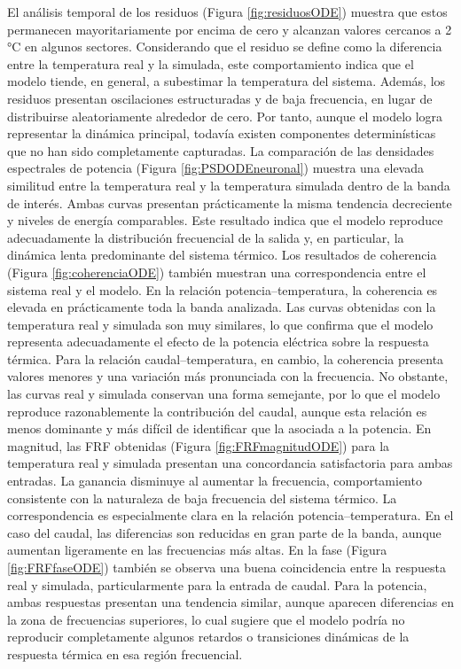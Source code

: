 \documentclass[11pt]{report}
\begin{document}
El análisis temporal de los residuos (Figura \ref{fig:residuosODE}) muestra que estos permanecen mayoritariamente por encima de cero y alcanzan valores cercanos a 2 °C en algunos sectores. Considerando que el residuo se define como la diferencia entre la temperatura real y la simulada, este comportamiento indica que el modelo tiende, en general, a subestimar la temperatura del sistema. Además, los residuos presentan oscilaciones estructuradas y de baja frecuencia, en lugar de distribuirse aleatoriamente alrededor de cero. Por tanto, aunque el modelo logra representar la dinámica principal, todavía existen componentes determinísticas que no han sido completamente capturadas.
La comparación de las densidades espectrales de potencia (Figura \ref{fig:PSDODEneuronal}) muestra una elevada similitud entre la temperatura real y la temperatura simulada dentro de la banda de interés. Ambas curvas presentan prácticamente la misma tendencia decreciente y niveles de energía comparables. Este resultado indica que el modelo reproduce adecuadamente la distribución frecuencial de la salida y, en particular, la dinámica lenta predominante del sistema térmico.
Los resultados de coherencia (Figura \ref{fig:coherenciaODE}) también muestran una correspondencia entre el sistema real y el modelo. En la relación potencia–temperatura, la coherencia es elevada en prácticamente toda la banda analizada. Las curvas obtenidas con la temperatura real y simulada son muy similares, lo que confirma que el modelo representa adecuadamente el efecto de la potencia eléctrica sobre la respuesta térmica. Para la relación caudal–temperatura, en cambio, la coherencia presenta valores menores y una variación más pronunciada con la frecuencia. No obstante, las curvas real y simulada conservan una forma semejante, por lo que el modelo reproduce razonablemente la contribución del caudal, aunque esta relación es menos dominante y más difícil de identificar que la asociada a la potencia.
En magnitud, las FRF obtenidas (Figura \ref{fig:FRFmagnitudODE}) para la temperatura real y simulada presentan una concordancia satisfactoria para ambas entradas. La ganancia disminuye al aumentar la frecuencia, comportamiento consistente con la naturaleza de baja frecuencia del sistema térmico. La correspondencia es especialmente clara en la relación potencia–temperatura. En el caso del caudal, las diferencias son reducidas en gran parte de la banda, aunque aumentan ligeramente en las frecuencias más altas. En la fase (Figura \ref{fig:FRFfaseODE}) también se observa una buena coincidencia entre la respuesta real y simulada, particularmente para la entrada de caudal. Para la potencia, ambas respuestas presentan una tendencia similar, aunque aparecen diferencias en la zona de frecuencias superiores, lo cual sugiere que el modelo podría no reproducir completamente algunos retardos o transiciones dinámicas de la respuesta térmica en esa región frecuencial.
\end{document}
